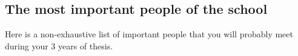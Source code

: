 \subsection{The most important people of the school}
Here is a non-exhaustive list of important people that you will probably meet during your 3 years of thesis.

\newcommand{\largcolp}{0.2\textwidth}
\newcommand{\largcol}{0.7\textwidth}

\newcommand{\pers}[4]{%
\begin{tabular}{m{\largcolp}}
\\
\ifthenelse{\equal{#1}{}}{~\vspace*{2.2cm}}{\raisebox{-.5\height}{\texttt{[image: images/\#1]}}}
\\~
\end{tabular} &
\begin{tabular}{m{\largcol}}
\textbf{#2} \\ \textit{(#3)} \\ #4
\end{tabular}\\\hline}

